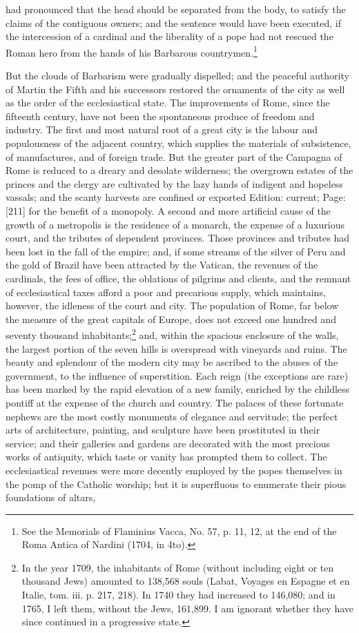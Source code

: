 had pronounced that the head should be separated from the body, to satisfy the claims of the contiguous owners; and the sentence would have been executed, if the intercession of a cardinal and the liberality of a pope had not rescued the Roman hero from the hands of his Barbarous countrymen.\footnote{See the Memorials of Flaminius Vacca, No. 57, p. 11, 12, at the end of the Roma Antica of Nardini (1704, in 4to).}

But the clouds of Barbarism were gradually dispelled; and the peaceful authority of Martin the Fifth and his successors restored the ornaments of the city as well as the order of the ecclesiastical state. The improvements of Rome, since the fifteenth century, have not been the spontaneous produce of freedom and industry. The first and most natural root of a great city is the labour and populousness of the adjacent country, which supplies the materials of subsistence, of manufactures, and of foreign trade. But the greater part of the Campagna of Rome is reduced to a dreary and desolate wilderness; the overgrown estates of the princes and the clergy are cultivated by the lazy hands of indigent and hopeless vassals; and the scanty harvests are confined or exported Edition: current; Page: [211] for the benefit of a monopoly. A second and more artificial cause of the growth of a metropolis is the residence of a monarch, the expense of a luxurious court, and the tributes of dependent provinces. Those provinces and tributes had been lost in the fall of the empire; and, if some streams of the silver of Peru and the gold of Brazil have been attracted by the Vatican, the revenues of the cardinals, the fees of office, the oblations of pilgrims and clients, and the remnant of ecclesiastical taxes afford a poor and precarious supply, which maintains, however, the idleness of the court and city. The population of Rome, far below the measure of the great capitals of Europe, does not exceed one hundred and seventy thousand inhabitants;\footnote{In the year 1709, the inhabitants of Rome (without including eight or ten thousand Jews) amounted to 138,568 souls (Labat, Voyages en Espagne et en Italie, tom. iii. p. 217, 218). In 1740 they had increased to 146,080; and in 1765, I left them, without the Jews, 161,899. I am ignorant whether they have since continued in a progressive state.} and, within the spacious enclosure of the walls, the largest portion of the seven hills is overspread with vineyards and ruins. The beauty and splendour of the modern city may be ascribed to the abuses of the government, to the influence of superstition. Each reign (the exceptions are rare) has been marked by the rapid elevation of a new family, enriched by the childless pontiff at the expense of the church and country. The palaces of these fortunate nephews are the most costly monuments of elegance and servitude; the perfect arts of architecture, painting, and sculpture have been prostituted in their service; and their galleries and gardens are decorated with the most precious works of antiquity, which taste or vanity has prompted them to collect. The ecclesiastical revenues were more decently employed by the popes themselves in the pomp of the Catholic worship; but it is superfluous to enumerate their pious foundations of altars, 